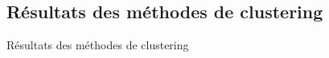\documentclass[aspectratio=169,professionalfonts, 12pt]{beamer}
\begin{document}
\begin{frame}
  \justifying
  \begin{minipage}{\textwidth}
    \begin{figure}[!h]
      \centering
      \qquad
    \end{figure}
  \end{minipage}
\end{frame}


\subsection{Résultats des méthodes de clustering}

\begin{frame}
  \justifying 
  \begin{minipage}{\textwidth}
    \begin{center}
      \huge Résultats des méthodes de clustering
    \end{center}
  \end{minipage}
\end{frame}
\end{document}
